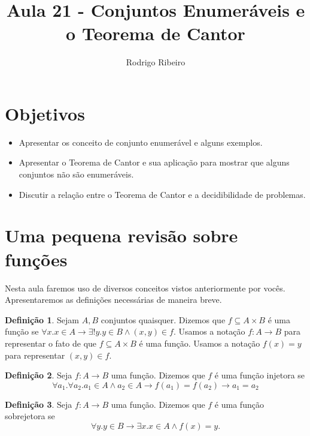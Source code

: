\documentclass[a4paper]{article}
\theoremstyle{definition}
\newtheorem{Definition}{Definição}
\begin{document}
\title{Aula 21 - Conjuntos Enumeráveis e o Teorema de Cantor}
  \author{Rodrigo Ribeiro}

  \maketitle

  \pagestyle{fancy}


  \section*{Objetivos}

  \begin{itemize}
     \item Apresentar os conceito de conjunto enumerável e alguns
       exemplos.
     \item Apresentar o Teorema de Cantor e sua aplicação para
       mostrar que alguns conjuntos não são enumeráveis.
     \item Discutir a relação entre o Teorema de Cantor e a
       decidibilidade de problemas.
  \end{itemize}

  \section{Uma pequena revisão sobre funções}

  Nesta aula faremos uso de diversos conceitos vistos anteriormente por vocês.
  Apresentaremos as definições necessárias de maneira breve.

  \begin{Definition}
    Sejam $A,B$ conjuntos quaisquer. Dizemos que $f \subseteq A \times B$ é uma
    função se $\forall x. x \in A \to \exists ! y . y \in B \land (x,y) \in f$.
    Usamos a notação $f : A \to B$ para representar o fato de que $f \subseteq
    A\times B$ é uma função. Usamos a notação $f(x) = y$ para representar
    $(x,y) \in f$.
  \end{Definition}

  \begin{Definition}
    Seja $f : A\to B$ uma função. Dizemos que $f$ é uma função injetora se
    \[
      \forall a_1.\forall a_2.  a_1 \in A \land a_2 \in A \to f(a_1) = f(a_2)
      \to a_1 = a_2
    \]
  \end{Definition}

  \begin{Definition}
    Seja $f : A\to B$ uma função. Dizemos que $f$ é uma função sobrejetora se
    \[
      \forall y . y \in B \to \exists x. x \in A \land f(x) = y.
    \]
  \end{Definition}
\end{document}
